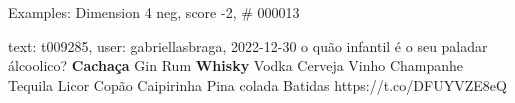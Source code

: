 \begin{frame}{Examples: Dimension 4 neg, score -2, \# 000013}
\footnotesize
\begin{alertblock}{text: t009285, user: gabriellasbraga, 2022-12-30}
o quão infantil é o seu paladar álcoolico? \textbf{Cachaça}  
Gin   Rum  
\textbf{Whisky}  Vodka  Cerveja 
 Vinho  Champanhe  
Tequila  Licor  Copão  
  Caipirinha  Pina colada 
 Batidas   
https://t.co/DFUYVZE8eQ 
\end{alertblock}
\end{frame}
